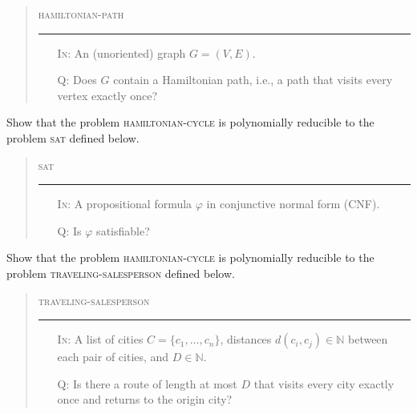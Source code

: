 \documentclass[a4paper,12pt]{amsart}
\begin{document}
\begin{problem}
        \bigskip
        \begin{quote}
        \begin{mdframed}
        \textsc{hamiltonian-path}
        \medskip\hrule\medskip
        \begin{itemize}
            \item[\textsc{In:}] An (unoriented) graph $G=(V,E)$.
            \item[\textsc{Q:}] Does $G$ contain a Hamiltonian path, i.e., a path that visits every vertex exactly once?
        \end{itemize}
        \end{mdframed}
        \end{quote}
        
        \end{problem}
        
        
        \medskip\begin{problem}
        Show that the problem \textsc{hamiltonian-cycle} is polynomially reducible to the problem \textsc{sat} defined below.
        
        \bigskip
        \begin{quote}
        \begin{mdframed}
        \textsc{sat}
        \medskip\hrule\medskip
        \begin{itemize}
            \item[\textsc{In:}] A propositional formula $\varphi$ in conjunctive normal form (CNF).
            \item[\textsc{Q:}] Is $\varphi$ satisfiable?
        \end{itemize}
        \end{mdframed}
        \end{quote}
        
        \end{problem}
        
        
        \medskip\begin{problem}
        Show that the problem \textsc{hamiltonian-cycle} is polynomially reducible to the problem \textsc{traveling-salesperson} defined below.
        
        \bigskip
        \begin{quote}
        \begin{mdframed}
        \textsc{traveling-salesperson}
        \medskip\hrule\medskip
        \begin{itemize}
            \item[\textsc{In:}] A list of cities $C=\{c_1,\dots,c_n\}$, distances $d(c_i,c_j)\in\mathbb N$ between each pair of cities, and $D\in\mathbb N$.
            \item[\textsc{Q:}] Is there a route of length at most $D$ that visits every city exactly once and returns to the origin city?
        \end{itemize}
        \end{mdframed}
        \end{quote}
        
        \end{problem}
        
\end{document}
